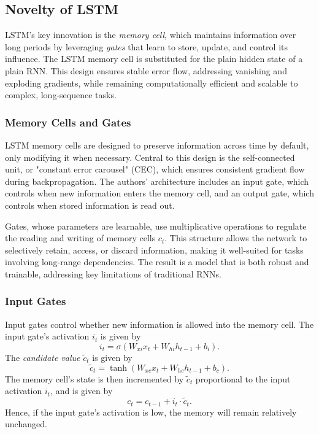 \documentclass[10pt]{article}
\begin{document}
\subsection*{Novelty of LSTM}

LSTM's key innovation is the \textit{memory cell}, which maintains information over long periods by leveraging \textit{gates} that learn to store, update, and control its influence. The LSTM memory cell is substituted for the plain hidden state of a plain RNN. This design ensures stable error flow, addressing vanishing and exploding gradients, while remaining computationally efficient and scalable to complex, long-sequence tasks.

\subsubsection*{Memory Cells and Gates}

LSTM memory cells are designed to preserve information across time by default, only modifying it when necessary. Central to this design is the self-connected unit, or "constant error carousel" (CEC), which ensures consistent gradient flow during backpropagation. The authors' architecture includes an input gate, which controls when new information enters the memory cell, and an output gate, which controls when stored information is read out.

Gates, whose parameters are learnable, use multiplicative operations to regulate the reading and writing of memory cells \(c_t\). This structure allows the network to selectively retain, access, or discard information, making it well-suited for tasks involving long-range dependencies. The result is a model that is both robust and trainable, addressing key limitations of traditional RNNs.

\subsubsection*{Input Gates}

Input gates control whether new information is allowed into the memory cell. The input gate's activation \(i_t\) is given by
\[
    i_t = \sigma(W_{xi} x_t + W_{hi} h_{t-1} + b_i).
\]
The \textit{candidate value} \(\tilde{c}_t\) is given by
\[
    \tilde{c}_t = \tanh(W_{xc} x_t + W_{hc} h_{t-1} + b_c).
\]
The memory cell's state is then incremented by \(\tilde{c}_t\) proportional to the input activation \(i_t\), and is given by
\[
    c_t = c_{t-1} + i_t \cdot \tilde{c}_t.
\]
Hence, if the input gate's activation is low, the memory will remain relatively unchanged.
\end{document}
